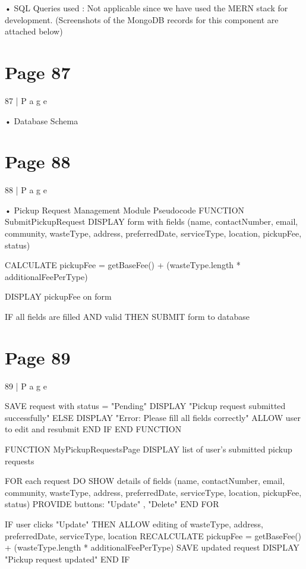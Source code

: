 \documentclass{article}
\begin{document}
• SQL Queries used : Not applicable since we have used the MERN stack for development.  
(Screenshots of the MongoDB records for this component are attached below) 
 
 

\section*{Page 87}
87 | P a g e 
 
 
 
 
 
 
 
 
 
• Database Schema 


\section*{Page 88}
88 | P a g e 
 
 
 
• Pickup Request Management Module Pseudocode 
FUNCTION SubmitPickupRequest 
    DISPLAY form with fields (name, contactNumber, email, community, wasteType, address, 
preferredDate, serviceType, location, pickupFee, status) 
 
    CALCULATE pickupFee = getBaseFee() + (wasteType.length * additionalFeePerType) 
  
    DISPLAY pickupFee on form 
  
    IF all fields are filled AND valid THEN 
        SUBMIT form to database 


\section*{Page 89}
89 | P a g e 
 
        SAVE request with status = "Pending" 
        DISPLAY "Pickup request submitted successfully" 
    ELSE 
        DISPLAY "Error: Please fill all fields correctly" 
        ALLOW user to edit and resubmit 
    END IF 
END FUNCTION 
 
FUNCTION MyPickupRequestsPage 
    DISPLAY list of user’s submitted pickup requests 
  
    FOR each request DO 
        SHOW details of fields (name, contactNumber, email, community, wasteType, address, 
preferredDate, serviceType, location, pickupFee, status) 
        PROVIDE buttons: "Update" , "Delete" 
    END FOR 
  
    IF user clicks "Update" THEN 
        ALLOW editing of wasteType, address, preferredDate, serviceType, location 
        RECALCULATE pickupFee = getBaseFee() + (wasteType.length * additionalFeePerType) 
        SAVE updated request 
        DISPLAY "Pickup request updated" 
    END IF 
  
\end{document}
